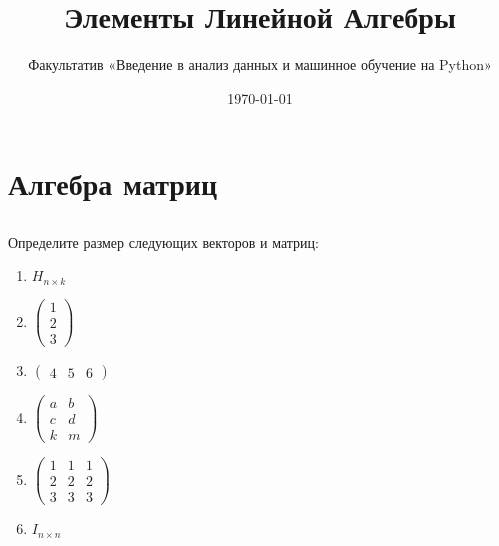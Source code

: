 \documentclass[11pt, a4paper]{extarticle}
\title{Элементы Линейной Алгебры}
\author{Факультатив «Введение в анализ данных и машинное обучение на Python»}
\date{\today}
\begin{document}
	
	\maketitle
	
\section{Алгебра матриц}

\subsection{}
Определите размер следующих векторов и матриц:
\begin{multicols}{3}
	\begin{enumerate}[label=\alph*)]
		\item $H_{n\times k}$
		\item $\begin{pmatrix}
		1 \\ 2 \\ 3
		\end{pmatrix}$
		\item $\begin{pmatrix}
		4 & 5 & 6
		\end{pmatrix}$
		
		\item $\begin{pmatrix}
			a & b \\
			c & d \\
			k & m
		\end{pmatrix}$
		
		\item $\begin{pmatrix}
			1 & 1 & 1 \\
			2 & 2 & 2 \\
			3 & 3 & 3
		\end{pmatrix}$
		
		\item $I_{n\times n}$
	\end{enumerate}
\end{multicols}
\end{document}
